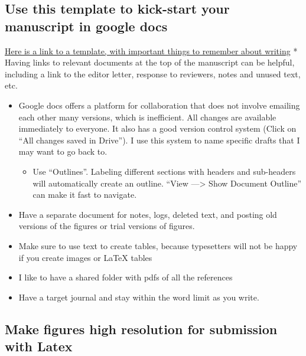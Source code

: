\documentclass[
  letterpaper,
  DIV=11,
  numbers=noendperiod]{scrreprt}
\providecommand{\tightlist}{%
  \setlength{\itemsep}{0pt}\setlength{\parskip}{0pt}}\usepackage{longtable,booktabs,array}
\begin{document}
\hypertarget{use-this-template-to-kick-start-your-manuscript-in-google-docs}{%
\subsection*{\texorpdfstring{\textbf{Use this template to kick-start
your manuscript in google
docs}}{Use this template to kick-start your manuscript in google docs}}\label{use-this-template-to-kick-start-your-manuscript-in-google-docs}}

\href{https://docs.google.com/document/d/15FYgxaSEQ6krNOlOq0qHmz0mD2No_tcRdVpG-xG8EXw/edit}{Here
is a link to a template, with important things to remember about
writing} * Having links to relevant documents at the top of the
manuscript can be helpful, including a link to the editor letter,
response to reviewers, notes and unused text, etc.

\begin{itemize}
\item
  Google docs offers a platform for collaboration that does not involve
  emailing each other many versions, which is inefficient. All changes
  are available immediately to everyone. It also has a good version
  control system (Click on ``All changes saved in Drive''). I use this
  system to name specific drafts that I may want to go back to.

  \begin{itemize}
  \tightlist
  \item
    Use ``Outlines''. Labeling different sections with headers and
    sub-headers will automatically create an outline. ``View
    ---\textgreater{} Show Document Outline'' can make it fast to
    navigate.
  \end{itemize}
\item
  Have a separate document for notes, logs, deleted text, and posting
  old versions of the figures or trial versions of figures.
\item
  Make sure to use text to create tables, because typesetters will not
  be happy if you create images or LaTeX tables
\item
  I like to have a shared folder with pdfs of all the references
\item
  Have a target journal and stay within the word limit as you write.
\end{itemize}

\hypertarget{make-figures-high-resolution-for-submission-with-latex}{%
\subsection*{\texorpdfstring{\textbf{Make figures high resolution for
submission with
Latex}}{Make figures high resolution for submission with Latex}}\label{make-figures-high-resolution-for-submission-with-latex}}
\end{document}
